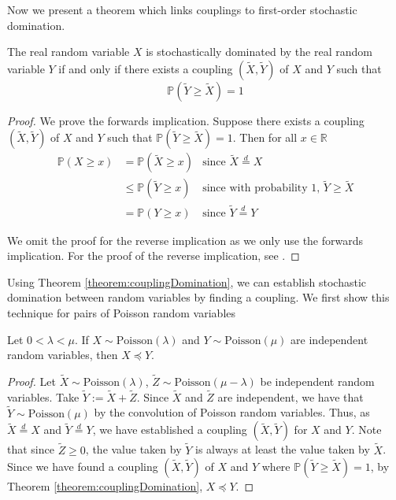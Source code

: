 
Now we present a theorem which links couplings to first-order stochastic domination.

\begin{theorem}\label{theorem:couplingDomination}
	The real random variable $X$ is stochastically dominated by the real random variable $Y$ if and only if there exists a coupling $(\tilde{X}, \tilde{Y})$ of $X$ and $Y$ such that
	$$
		\mathbb{P}(\tilde{Y} \geq \tilde{X}) = 1
	$$
\end{theorem}

\begin{proof}
	We prove the forwards implication. Suppose there exists a coupling $(\tilde{X}, \tilde{Y})$ of $X$ and $Y$ such that $\mathbb{P}(\tilde{Y} \geq \tilde{X}) = 1$. Then for all $x \in \mathbb{R}$
	\begin{align*}
		\mathbb{P}(X \geq x) &= \mathbb{P}(\tilde{X} \geq x) & \text{since } \tilde{X} \stackrel{d}{=} X \\
		&\leq \mathbb{P}(\tilde{Y} \geq x) & \text{since with probability 1, } \tilde{Y} \geq \tilde{X} \\
		&= \mathbb{P}(Y \geq x) & \text{since } \tilde{Y} \stackrel{d}{=} Y 
	\end{align*}

	We omit the proof for the reverse implication as we only use the forwards implication. For the proof of the reverse implication, see \cite{coupling}.
\end{proof}

Using Theorem \ref{theorem:couplingDomination}, we can establish stochastic domination between random variables by finding a coupling. We first show this technique	for pairs of Poisson random variables

\begin{theorem}\label{theorem:poissonDomination}
	Let $0 < \lambda < \mu$. If $X \sim \text{Poisson}(\lambda)$ and $Y \sim \text{Poisson}(\mu)$ are independent random variables, then $X \preceq Y$. 
\end{theorem}

\begin{proof}
	Let $\tilde{X} \sim \text{Poisson}(\lambda)$, $\tilde{Z} \sim \text{Poisson}(\mu - \lambda)$ be independent random variables. Take $\tilde{Y} := \tilde{X} + \tilde{Z}$. Since $\tilde{X}$ and $\tilde{Z}$ are independent, we have that $\tilde{Y} \sim \text{Poisson}(\mu)$ by the convolution of Poisson random variables. Thus, as $\tilde{X} \stackrel{d}{=} X$ and $\tilde{Y} \stackrel{d}{=} Y $, we have established a coupling $(\tilde{X}, \tilde{Y})$ for $X$ and $Y$. Note that since $\tilde{Z} \geq 0$, the value taken by $\tilde{Y}$ is always at least the value taken by $\tilde{X}$. Since we have found a coupling $(\tilde{X}, \tilde{Y})$ of $X$ and $Y$ where $\mathbb{P}(\tilde{Y} \geq \tilde{X}) = 1$, by Theorem \ref{theorem:couplingDomination}, $X \preceq Y$.
\end{proof}

